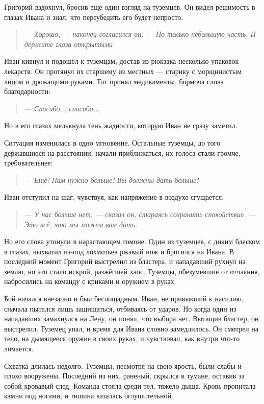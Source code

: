 \documentclass[12pt,a4paper]{book} %
\newenvironment{dialogue}{\begin{quote}\itshape}{\end{quote}}
\begin{document}
Григорий вздохнул, бросив ещё один взгляд на туземцев. Он видел решимость в глазах Ивана и знал, что переубедить его будет непросто.

\begin{dialogue}
--- Хорошо, --- наконец согласился он. --- Но только небольшую часть. И держите глаза открытыми.
\end{dialogue}

Иван кивнул и подошёл к туземцам, достав из рюкзака несколько упаковок лекарств. Он протянул их старшему из местных --- старику с морщинистым лицом и дрожащими руками. Тот принял медикаменты, бормоча слова благодарности:

\begin{dialogue}
--- Спасибо... спасибо...
\end{dialogue}

Но в его глазах мелькнула тень жадности, которую Иван не сразу заметил.

Ситуация изменилась в одно мгновение. Остальные туземцы, до того державшиеся на расстоянии, начали приближаться, их голоса стали громче, требовательнее:

\begin{dialogue}
--- Ещё! Нам нужно больше! Вы должны дать больше!
\end{dialogue}

Иван отступил на шаг, чувствуя, как напряжение в воздухе сгущается.

\begin{dialogue}
--- У нас больше нет, --- сказал он, стараясь сохранить спокойствие. --- Это всё, что мы можем вам дать.
\end{dialogue}

Но его слова утонули в нарастающем гомоне. Один из туземцев, с диким блеском в глазах, выхватил из-под лохмотьев ржавый нож и бросился на Ивана. В последний момент Григорий выстрелил из бластера, и нападавший рухнул на землю, но это стало искрой, разжёгшей хаос. Туземцы, обезумевшие от отчаяния, набросились на команду с криками и оружием в руках.

Бой начался внезапно и был беспощадным. Иван, не привыкший к насилию, сначала пытался лишь защищаться, отбиваясь от ударов. Но когда один из нападавших замахнулся на Лену, он понял, что выбора нет. Вытащив бластер, он выстрелил. Туземец упал, и время для Ивана словно замедлилось. Он смотрел на тело, на дымящееся оружие в своих руках, и чувствовал, как внутри что-то ломается.

Схватка длилась недолго. Туземцы, несмотря на свою ярость, были слабы и плохо вооружены. Последний из них, раненый, скрылся в тумане, оставив за собой кровавый след. Команда стояла среди тел, тяжело дыша. Кровь пропитала камни под ногами, и тишина казалась оглушительной.
\end{document}
